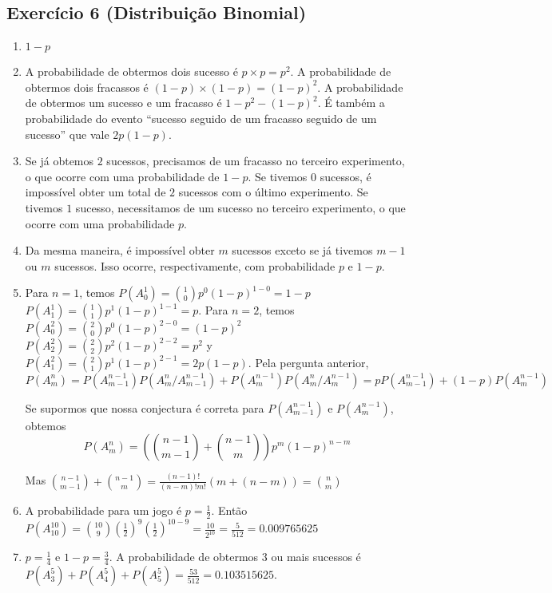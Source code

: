 \subsection*{Exercício 6 (Distribuição Binomial)}

\begin{enumerate}
  \item $1-p$
  \item A probabilidade de obtermos dois sucesso é $p \times p = p^2$.
    A probabilidade de obtermos dois fracassos é ${(1-p)} \times {(1-p)}
    = {(1-p)}^2$. A probabilidade de obtermos um sucesso e um fracasso
    é $1 - p^2 - {(1-p)}^2$. É também a probabilidade do evento
    ``sucesso seguido de um fracasso seguido de um sucesso'' que vale
    $2 p{(1-p)}$.
  \item Se já obtemos $2$ sucessos, precisamos de um fracasso no terceiro
    experimento, o que ocorre com uma probabilidade de $1 - p$.
    Se tivemos $0$ sucessos, é impossível obter um total de $2$ sucessos com o
    último experimento.
    Se tivemos $1$ sucesso, necessitamos de um sucesso no terceiro experimento,
    o que ocorre com uma probabilidade $p$.
  \item Da mesma maneira, é impossível obter $m$ sucessos exceto
    se já tivemos $m-1$ ou $m$ sucessos. Isso ocorre, respectivamente,
    com probabilidade $p$ e $1-p$.

  \item 
    Para $n=1$, temos
    $P(A_0^1) = \binom{1}{0} p^0 \left(1-p\right)^{1-0} = 1-p$
    $P(A_1^1) = \binom{1}{1} p^1 \left(1-p\right)^{1-1} = p$.
    Para $n=2$, temos
    $P(A_0^2) = \binom{2}{0} p^0 \left(1-p\right)^{2-0} = \left(1-p\right)^2$
    $P(A_2^2) = \binom{2}{2} p^2 \left(1-p\right)^{2-2} = p^2$ y
    $P(A_1^2) = \binom{2}{1} p^1 \left(1-p\right)^{2-1} = 2 p \left(1-p\right)$.
    Pela pergunta anterior,
    $$
    P(A_m^n) = P(A_{m-1}^{n-1}) P(A_m^n / A_{m-1}^{n-1}) +
    P(A_{m}^{n-1}) P(A_m^n / A_{m}^{n-1}) =
    p {P(A_{m-1}^{n-1})} + \left(1-p\right) {P(A_{m}^{n-1})}
    $$

    Se supormos que nossa conjectura é correta para
    ${P(A_{m-1}^{n-1})}$
    e ${P(A_{m}^{n-1})}$, obtemos
    $$
    P(A_m^n) = \left( 
    \binom{n-1}{m-1} + \binom{n -1}{m}
    \right) p^m \left(1-p\right)^{n-m}
    $$

    Mas
    $\binom{n-1}{m-1} + \binom{n -1}{m}  = 
    \frac{\left(n-1\right)!}{\left(n-m\right)! m!} 
    \left(m + \left(n-m\right)\right) = \binom{n}{m}$

  \item A probabilidade para um jogo é $p = \frac{1}{2}$.
    Então
    $P(A_{10}^{10}) = \binom{10}{9} \left(\frac{1}{2}\right)^{9} 
    \left(\frac{1}{2}\right)^{10-9} = \frac{10}{2^{10}} = \frac{5}{512}
    = 0.009765625$

  \item $p = \frac{1}{4}$ e $1-p = \frac{3}{4}$.
    A probabilidade de obtermos $3$ ou mais sucessos é
    $P(A_{3}^{5}) + P(A_{4}^{5}) + P(A_{5}^{5}) =
    \frac{53}{512} = 0.103515625$.
\end{enumerate}
